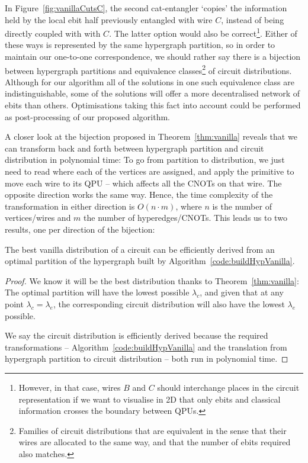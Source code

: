 \begin{remark} \normalfont 
In Figure~\ref{fig:vanillaCutsC}, the second cat-entangler `copies' the information held by the local ebit half previously entangled with wire \(C\), instead of being directly coupled with with \(C\). The latter option would also be correct\footnote{However, in that case, wires \(B\) and \(C\) should interchange places in the circuit representation if we want to visualise in 2D that only ebits and classical information crosses the boundary between QPUs.}. Either of these ways is represented by the same hypergraph partition, so in order to maintain our one-to-one correspondence, we should rather say there is a bijection between hypergraph partitions and equivalence classes\footnote{Families of circuit distributions that are equivalent in the sense that their wires are allocated to the same way, and that the number of ebits required also matches.} of circuit distributions. Although for our algorithm all of the solutions in one such equivalence class are indistinguishable, some of the solutions will offer a more decentralised network of ebits than others. Optimisations taking this fact into account could be performed as post-processing of our proposed algorithm.
\end{remark}

A closer look at the bijection proposed in Theorem~\ref{thm:vanilla} reveals that we can transform back and forth between hypergraph partition and circuit distribution in polynomial time: To go from partition to distribution, we just need to read where each of the vertices are assigned, and apply the primitive to move each wire to its QPU -- which affects all the CNOTs on that wire. The opposite direction works the same way. Hence, the time complexity of the transformation in either direction is \(O(n\cdot m)\), where \(n\) is the number of vertices/wires and \(m\) the number of hyperedges/CNOTs. This leads us to two results, one per direction of the bijection:

\begin{corollary} The best vanilla distribution of a circuit can be efficiently derived from an optimal partition of the hypergraph built by Algorithm~\ref{code:buildHypVanilla}.
\label{col:vanilla}
\end{corollary} \begin{proof}
We know it will be the best distribution thanks to Theorem~\ref{thm:vanilla}: The optimal partition will have the lowest possible \(\lambda_c\), and given that at any point \(\lambda_c = \lambda_e\), the corresponding circuit distribution will also have the lowest \(\lambda_e\) possible.

We say the circuit distribution is efficiently derived because the required transformations -- Algorithm~\ref{code:buildHypVanilla} and the translation from hypergraph partition to circuit distribution -- both run in polynomial time.

\end{proof}

